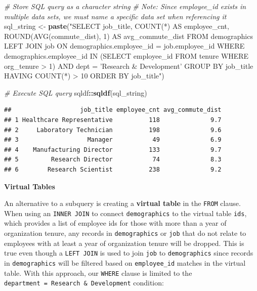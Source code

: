 \documentclass[]{book}
\newenvironment{Shaded}{\begin{snugshade}}{\end{snugshade}}
\newcommand{\CommentTok}[1]{\textcolor[rgb]{0.56,0.35,0.01}{\textit{#1}}}
\newcommand{\KeywordTok}[1]{\textcolor[rgb]{0.13,0.29,0.53}{\textbf{#1}}}
\newcommand{\NormalTok}[1]{#1}
\newcommand{\OperatorTok}[1]{\textcolor[rgb]{0.81,0.36,0.00}{\textbf{#1}}}
\newcommand{\StringTok}[1]{\textcolor[rgb]{0.31,0.60,0.02}{#1}}
\begin{document}
\begin{Shaded}
\begin{Highlighting}[]
\CommentTok{# Store SQL query as a character string}
\CommentTok{# Note: Since employee_id exists in multiple data sets, we must name a specific data set when referencing it}
\NormalTok{sql_string <-}\StringTok{ }\KeywordTok{paste}\NormalTok{(}\StringTok{"SELECT}
\StringTok{                      job_title,}
\StringTok{                      COUNT(*) AS employee_cnt,}
\StringTok{                      ROUND(AVG(commute_dist), 1) AS avg_commute_dist}
\StringTok{                    FROM}
\StringTok{                        demographics}
\StringTok{                      LEFT JOIN}
\StringTok{                        job}
\StringTok{                      ON}
\StringTok{                        demographics.employee_id = job.employee_id}
\StringTok{                    WHERE}
\StringTok{                        demographics.employee_id IN (SELECT employee_id FROM tenure WHERE org_tenure > 1)}
\StringTok{                      AND }
\StringTok{                        dept = 'Research & Development'}
\StringTok{                    GROUP BY}
\StringTok{                      job_title}
\StringTok{                    HAVING}
\StringTok{                      COUNT(*) > 10}
\StringTok{                    ORDER BY}
\StringTok{                      job_title"}\NormalTok{)}

\CommentTok{# Execute SQL query}
\NormalTok{sqldf}\OperatorTok{::}\KeywordTok{sqldf}\NormalTok{(sql_string)}
\end{Highlighting}
\end{Shaded}

\begin{verbatim}
##                   job_title employee_cnt avg_commute_dist
## 1 Healthcare Representative          118              9.7
## 2     Laboratory Technician          198              9.6
## 3                   Manager           49              6.9
## 4    Manufacturing Director          133              9.7
## 5         Research Director           74              8.3
## 6        Research Scientist          238              9.2
\end{verbatim}

\textbf{Virtual Tables}

An alternative to a subquery is creating a \textbf{virtual table} in the \texttt{FROM} clause. When using an \texttt{INNER\ JOIN} to connect \texttt{demographics} to the virtual table \texttt{ids}, which provides a list of employee ids for those with more than a year of organization tenure, any records in \texttt{demographics} or \texttt{job} that do not relate to employees with at least a year of organization tenure will be dropped. This is true even though a \texttt{LEFT\ JOIN} is used to join \texttt{job} to \texttt{demographics} since records in \texttt{demographics} will be filtered based on \texttt{employee\_id} matches in the virtual table. With this approach, our \texttt{WHERE} clause is limited to the \texttt{department\ =\ \textquotesingle{}Research\ \&\ Development\textquotesingle{}} condition:
\end{document}
